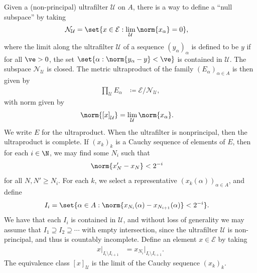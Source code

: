 \documentclass[10pt]{mypackage}
\renewcommand{\coloneq}{\coloneqq}
\begin{document}
Given a (non-principal) ultrafilter $ \mathcal{U} $ on $A$, there is a way to define a ``null subspace'' by taking
\begin{align*}
  \mathcal{N}_{\mathcal{U}} &= \set{x\in \mathcal{E} : \lim_{ \mathcal{U} }\norm{x_{\alpha}} = 0},
\end{align*}
where the limit along the ultrafilter $\mathcal{U}$ of a sequence $\left( y_{\alpha} \right)_{\alpha}$ is defined to be $y$ if for all $\ve > 0$, the set $\set{\alpha : \norm{y_{\alpha}-y} < \ve}$ is contained in $ \mathcal{U} $. The subspace $ \mathcal{N}_{\mathcal{U}} $  is closed. The metric ultraproduct of the family $\left( E_{\alpha} \right)_{\alpha\in A}$ is then given by
\begin{align*}
  \prod_{\mathcal{U}} E_{\alpha} &\coloneq \mathcal{E}/\mathcal{N}_{\mathcal{U}},
\end{align*}
with norm given by
\begin{align*}
  \norm{\left[ x \right]_{\mathcal{U}}} &= \lim_{\mathcal{U}} \norm{x_{\alpha}}.
\end{align*}
We write $E$ for the ultraproduct. When the ultrafilter is nonprincipal, then the ultraproduct is complete. If $\left( x_k \right)_k$ is a Cauchy sequence of elements of $ E $, then for each $i\in \N$, we may find some $N_i$ such that
\begin{align*}
  \norm{x_N' - x_N} &< 2^{-i}
\end{align*}
for all $N,N' \geq N_i$. For each $k$, we select a representative $\left( x_k(\alpha) \right)_{\alpha\in A}$, and define
\begin{align*}
  I_i &= \set{\alpha\in A : \norm{x_{N_i}(\alpha) - x_{N_{i+1}}(\alpha)} < 2^{-i}}.
\end{align*}
We have that each $I_i$ is contained in $ \mathcal{U} $, and without loss of generality we may assume that $I_1\supseteq I_2\supseteq\cdots$ with empty intersection, since the ultrafilter $ \mathcal{U} $ is non-principal, and thus is countably incomplete. Define an element $x\in \mathcal{E}$ by taking
\begin{align*}
  x|_{I_i\setminus I_{i+1}} &= x_{N_i}|_{I_i\setminus I_{i+1}}.
\end{align*}
The equivalence class $\left[ x \right]_{\mathcal{U}}$ is the limit of the Cauchy sequence $\left( x_k \right)_k$.
\end{document}
